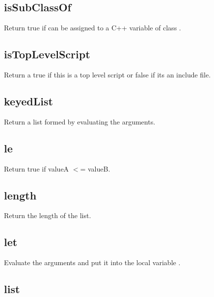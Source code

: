 \begin{itemize}
\subsection{isSubClassOf}

  Return true if  can be assigned to a C++ variable of class .

\subsection{isTopLevelScript}

  Return a true if this is a top level script or false if its an include file.

\subsection{keyedList}
  \par

  Return a list formed by evaluating the arguments.

\subsection{le}
  \par

  Return true if valueA $<$= valueB.

\subsection{length}

  Return the length of the list.

\subsection{let}
  \par

  Evaluate the arguments and put it into the local variable .

\subsection{list}
  \par


\end{itemize}
